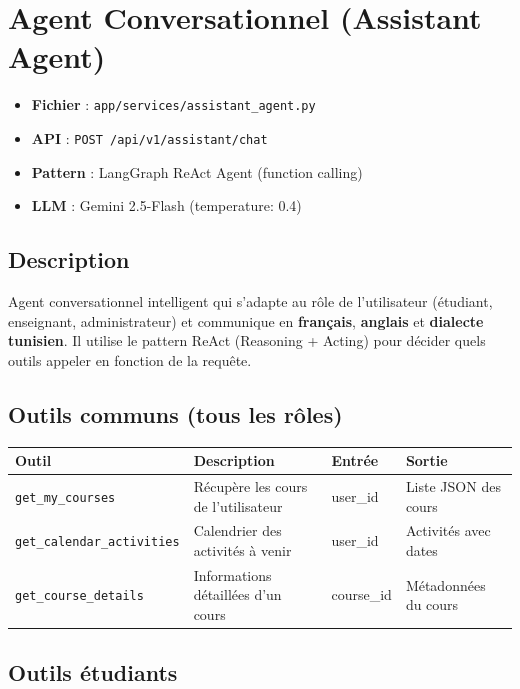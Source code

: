 \documentclass[12pt,a4paper]{article}
\begin{document}
\section{Agent Conversationnel (Assistant Agent)}

\begin{itemize}[leftmargin=*]
    \item \textbf{Fichier} : \texttt{app/services/assistant\_agent.py}
    \item \textbf{API} : \texttt{POST /api/v1/assistant/chat}
    \item \textbf{Pattern} : LangGraph ReAct Agent (function calling)
    \item \textbf{LLM} : Gemini 2.5-Flash (temperature: 0.4)
\end{itemize}

\subsection{Description}
Agent conversationnel intelligent qui s'adapte au rôle de l'utilisateur (étudiant, enseignant, administrateur) et communique en \textbf{français}, \textbf{anglais} et \textbf{dialecte tunisien}. Il utilise le pattern ReAct (Reasoning + Acting) pour décider quels outils appeler en fonction de la requête.

\subsection{Outils communs (tous les rôles)}

\begin{longtable}{@{}p{3.8cm}p{6cm}p{2cm}p{3cm}@{}}
\toprule
\textbf{Outil} & \textbf{Description} & \textbf{Entrée} & \textbf{Sortie} \\
\midrule
\endhead
\texttt{get\_my\_courses} & Récupère les cours de l'utilisateur & user\_id & Liste JSON des cours \\
\texttt{get\_calendar\_activities} & Calendrier des activités à venir & user\_id & Activités avec dates \\
\texttt{get\_course\_details} & Informations détaillées d'un cours & course\_id & Métadonnées du cours \\
\bottomrule
\end{longtable}

\subsection{Outils étudiants}
\end{document}
